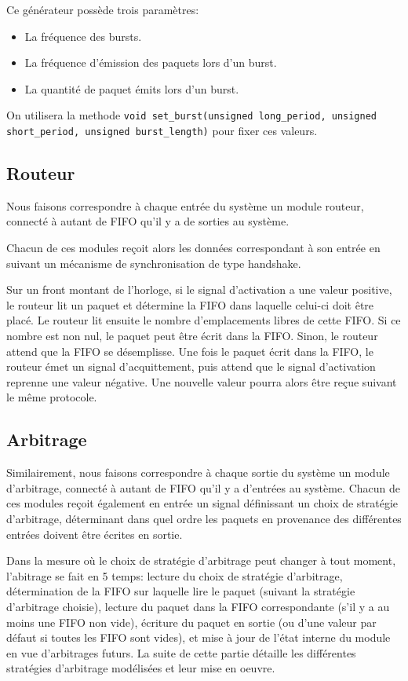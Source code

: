 \documentclass[11pt]{article}
\begin{document}
Ce générateur possède trois paramètres:
\begin{itemize}
  \item La fréquence des bursts.
  \item La fréquence d'émission des paquets lors d'un burst.
  \item La quantité de paquet émits lors d'un burst.
\end{itemize}
On utilisera la methode \texttt{void set\_burst(unsigned long\_period, unsigned
short\_period, unsigned burst\_length)} pour fixer ces valeurs.

\subsection{Routeur}
Nous faisons correspondre à chaque entrée du système un module routeur, connecté
à autant de FIFO qu'il y a de sorties au système.

Chacun de ces modules reçoit alors les données correspondant à son entrée en
suivant un mécanisme de synchronisation de type handshake.


Sur un front montant de l'horloge, si le signal d'activation a une valeur positive,
le routeur lit un paquet et détermine la FIFO dans laquelle celui-ci doit être placé.
Le routeur lit ensuite le nombre d'emplacements libres de cette FIFO.
Si ce nombre est non nul, le paquet peut être écrit dans la FIFO.
Sinon, le routeur attend que la FIFO se désemplisse.
Une fois le paquet écrit dans la FIFO, le routeur émet un signal d'acquittement,
puis attend que le signal d'activation reprenne une valeur négative.
Une nouvelle valeur pourra alors être reçue suivant le même protocole.

\subsection{Arbitrage}
Similairement, nous faisons correspondre à chaque sortie du système un module
d'arbitrage, connecté à autant de FIFO qu'il y a d'entrées au système.
Chacun de ces modules reçoit également en entrée un signal définissant un choix
de stratégie d'arbitrage, déterminant dans quel ordre
les paquets en provenance des différentes entrées doivent être écrites en
sortie.


Dans la mesure où le choix de stratégie d'arbitrage peut changer à tout moment,
l'abitrage se fait en 5 temps: lecture du choix de stratégie d'arbitrage,
détermination de la FIFO sur laquelle lire le paquet (suivant la stratégie
d'arbitrage choisie), lecture du paquet dans la FIFO correspondante (s'il y a au
moins une FIFO non vide), écriture du paquet en sortie (ou d'une valeur par
défaut si toutes les FIFO sont vides), et mise à jour de l'état interne du
module en vue d'arbitrages futurs. La suite de cette partie détaille les
différentes stratégies d'arbitrage modélisées et leur mise en oeuvre.
\end{document}

